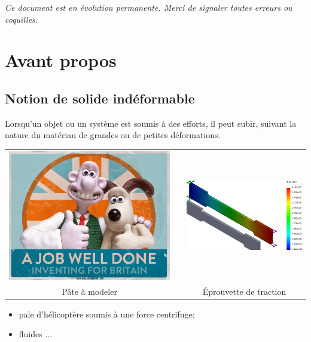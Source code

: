 \documentclass[10pt,oneside]{article}
\begin{document}
\setlength{\parskip}{0ex plus 0.2ex minus 0ex}
 \renewcommand{\contentsname}{}
 \renewcommand{\baselinestretch}{1}



\textit{Ce document est en évolution permanente. Merci de signaler toutes erreurs ou coquilles.}
\tableofcontents

 \renewcommand{\baselinestretch}{1.2}
\setlength{\parskip}{2ex plus 0.5ex minus 0.2ex}



\section{Avant propos}

\subsection{Notion de solide indéformable}
Lorsqu'un objet ou un système est soumis à des efforts, il peut subir, suivant la nature du matériau de grandes ou de petites déformations. 

\begin{exemple}
\begin{center}
\begin{tabular}{ccc}
\includegraphics[width=.25\textwidth]{png/wg} & &
\includegraphics[width=.25\textwidth]{png/eprouvette} \\
Pâte à modeler \cite{cite4}& &
Éprouvette de traction\\
\end{tabular}
\end{center}
\begin{itemize}
\item pale d'hélicoptère soumis à une force centrifuge;
\item fluides ...
\end{itemize}
\end{exemple}
\end{document}
